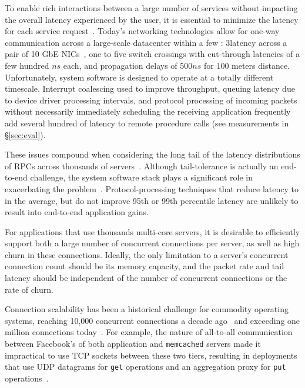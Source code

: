  To enable rich interactions
between a large number of services %
without impacting the overall latency experienced by the user, it is essential
to minimize the latency for each service
request~\cite{luiz-isscc,rumble2011s}. Today's networking technologies
allow for one-way communication across a large-scale datacenter within
a few \microsecond: 3\microsecond latency across a pair of 10 GbE
NICs~\cite{cisco-sereno}, one to five switch crossings with
cut-through latencies of a few hundred $ns$ each, and propagation
delays of 500$ns$ for 100 meters distance. Unfortunately, system
software is designed to operate at a totally different
timescale. Interrupt coalescing used to improve throughput, queuing
latency due to device driver processing intervals, and protocol
processing of incoming packets without necessarily immediately
scheduling the receiving application frequently add several hundred
\microsecond of latency to remote procedure calls (see measurements in
\S\ref{sec:eval}).


These issues compound when considering the long tail of the latency
distributions of RPCs across thousands of
servers~\cite{DBLP:journals/cacm/DeanB13}. Although tail-tolerance is
actually an end-to-end challenge, the system software stack plays a
significant role in exacerbating the problem~\cite{Leverich:RHSU:2014}.
Protocol-processing techniques that reduce latency to \microsecond in
the average, but do not improve 95th or 99th percentile latency are
unlikely to result into end-to-end application gains.

 For applications that use thousands
multi-core servers, it is desirable to efficiently support both a
large number of concurrent connections per server, as well as high
churn in these connections.  Ideally, the only limitation to a
server's concurrent connection count should be its memory capacity, and
the packet rate and tail latency should be independent of the number
of concurrent connections or the rate of churn.
 
Connection scalability has been a historical challenge for commodity
operating systems, reaching 10,000 concurrent connections a decade
ago~\cite{theC10Kproblem} and exceeding one million connections
today~\cite{theC10Mproblem}.  For example, the nature of all-to-all
communication between Facebook's  of both application and \texttt{memcached}
servers made it impractical to use TCP sockets between these two
tiers, resulting in deployments that use UDP datagrams for
\texttt{get} operations and an aggregation proxy for \texttt{put}
operations~\cite{nishtala2013scaling}.

